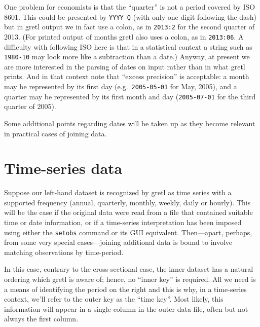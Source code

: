 One problem for economists is that the ``quarter'' is not a period
covered by ISO 8601. This could be presented by \texttt{YYYY-Q} (with
only one digit following the dash) but in gretl output we in fact use
a colon, as in \texttt{2013:2} for the second quarter of 2013. (For
printed output of months gretl also uses a colon, as in
\texttt{2013:06}. A difficulty with following ISO here is that in a
statistical context a string such as \texttt{1980-10} may look more
like a subtraction than a date.)  Anyway, at present we are more
interested in the parsing of dates on input rather than in what gretl
prints. And in that context note that ``excess precision'' is
acceptable: a month may be represented by its first day (e.g.\
\texttt{2005-05-01} for May, 2005), and a quarter may be represented
by its first month and day (\texttt{2005-07-01} for the third quarter
of 2005).

Some additional points regarding dates will be taken up as they become
relevant in practical cases of joining data.

\section{Time-series data}
\label{sec:join-timeser}

Suppose our left-hand dataset is recognized by gretl as time series
with a supported frequency (annual, quarterly, monthly, weekly, daily
or hourly). This will be the case if the original data were read from
a file that contained suitable time or date information, or if a
time-series interpretation has been imposed using either the
\texttt{setobs} command or its GUI equivalent.  Then---apart, perhaps,
from some very special cases---joining additional data is bound to
involve matching observations by time-period. 

In this case, contrary to the cross-sectional case, the inner dataset
has a natural ordering which gretl is aware of; hence, no ``inner
key'' is required. All we need is a means of identifying the period on
the right and this is why, in a time-series context, we'll refer to
the outer key as the ``time key''. Most likely, this information will
appear in a single column in the outer data file, often but not always
the first column.

